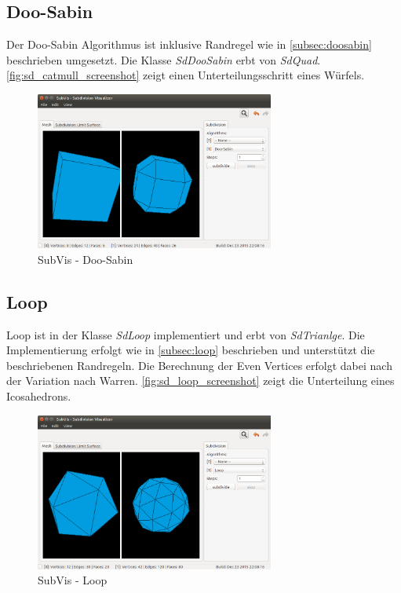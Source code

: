 \subsection{Doo-Sabin}

Der Doo-Sabin Algorithmus ist inklusive Randregel wie in \autoref{subsec:doosabin}
beschrieben umgesetzt. Die Klasse \emph{SdDooSabin} erbt von \emph{SdQuad}.
\autoref{fig:sd_catmull_screenshot} zeigt einen Unterteilungsschritt eines Würfels.

\begin{figure}
  \centering
  \includegraphics[width=0.7\textwidth]{content/media/sd_doosabin_screenshot.png}
  \caption{SubVis - Doo-Sabin}
  \label{fig:sd_doosabin_screenshot}
\end{figure}

\subsection{Loop}

Loop ist in der Klasse \emph{SdLoop} implementiert und erbt von \emph{SdTrianlge}.
Die Implementierung erfolgt wie in \autoref{subsec:loop} beschrieben
und unterstützt die beschriebenen Randregeln.
Die Berechnung der Even Vertices erfolgt dabei nach der Variation nach Warren.
\autoref{fig:sd_loop_screenshot} zeigt die Unterteilung eines Icosahedrons.

\begin{figure}
  \centering
  \includegraphics[width=0.7\textwidth]{content/media/sd_loop_screenshot.png}
  \caption{SubVis - Loop}
  \label{fig:sd_loop_screenshot}
\end{figure}

